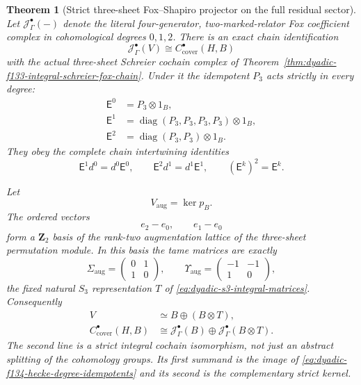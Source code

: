 \documentclass[11pt]{article}
\newtheorem{theorem}{Theorem}[section]
\theoremstyle{definition}
\begin{document}
\begin{theorem}[Strict three-sheet Fox--Shapiro projector on the full residual sector]
Let $\mathcal J_\Gamma^\bullet(-)$
denote the \emph{literal
four-generator,
two-marked-relator}
Fox coefficient complex
in cohomological degrees
$0,1,2$.  There is an
exact chain identification
\begin{equation}\label{eq:dyadic-f134-coinduced-cover-equality}
\boxed{\quad
\mathcal J_\Gamma^\bullet(V)
\cong
C_{\mathrm{cover}}^\bullet(H,B)
\quad}
\end{equation}
with the actual
three-sheet Schreier
cochain complex of
Theorem~\ref{thm:dyadic-f133-integral-schreier-fox-chain}.
Under it the
idempotent $P_3$
acts \emph{strictly}
in every degree:
\begin{equation}\label{eq:dyadic-f134-hecke-degree-idempotents}
\boxed{
\begin{aligned}
\mathsf E^0&=P_3\otimes 1_B,\\
\mathsf E^1&=\operatorname{diag}
(P_3,P_3,P_3,P_3)\otimes1_B,\\
\mathsf E^2&=\operatorname{diag}
(P_3,P_3)\otimes1_B.
\end{aligned}}
\end{equation}
They obey the
complete chain
intertwining
identities
\begin{equation}\label{eq:dyadic-f134-strict-hecke-chain}
\boxed{\quad
\mathsf E^1d^0=d^0\mathsf E^0,
\qquad
\mathsf E^2d^1=d^1\mathsf E^1,
\qquad
(\mathsf E^k)^2=\mathsf E^k.
\quad}
\end{equation}

Let
\[
V_{\mathrm{aug}}=\ker p_B.
\]
The ordered vectors
\begin{equation}\label{eq:dyadic-f134-two-augmentation-cosets}
e_2-e_0,\qquad e_1-e_0
\end{equation}
form a $\mathbf Z_2$
basis of the
rank-two
augmentation
lattice of the
three-sheet
permutation module.
In this basis the
tame matrices are
exactly
\[
\Sigma_{\mathrm{aug}}
=\begin{pmatrix}0&1\\1&0\end{pmatrix},
\qquad
\Upsilon_{\mathrm{aug}}
=\begin{pmatrix}-1&-1\\1&0\end{pmatrix},
\]
the fixed natural
$S_3$ representation
$T$ of
\eqref{eq:dyadic-s3-integral-matrices}.
Consequently
\begin{equation}\label{eq:dyadic-f134-universal-coinduced-split}
\boxed{
\begin{aligned}
V&\simeq B\oplus(B\otimes T),\\
C_{\mathrm{cover}}^\bullet(H,B)
&\cong
\mathcal J_\Gamma^\bullet(B)
\oplus
\mathcal J_\Gamma^\bullet(B\otimes T).
\end{aligned}}
\end{equation}
The second line is a
\emph{strict integral
cochain isomorphism},
not just an abstract
splitting of the
cohomology groups.
Its first summand is
the image of
\eqref{eq:dyadic-f134-hecke-degree-idempotents}
and its second is
the complementary
strict kernel.


\end{theorem}
\end{document}
